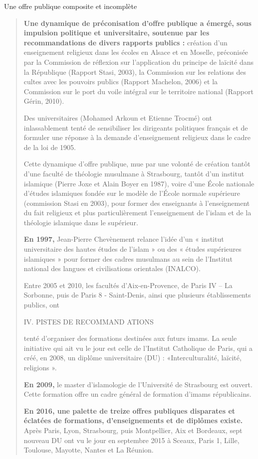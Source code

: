 Une offre publique composite et incomplète

\begin{quote}
\textbf{Une dynamique de préconisation d'offre publique a émergé, sous
impulsion politique et universitaire, soutenue par les recommandations
de divers rapports publics :} création d'un enseignement religieux dans
les écoles en Alsace et en Moselle, préconisée par la Commission de
réflexion sur l'application du principe de laïcité dans la République
(Rapport Stasi, 2003), la Commission sur les relations des cultes avec
les pouvoirs publics (Rapport Machelon, 2006) et la Commission sur le
port du voile intégral sur le territoire national (Rapport Gérin, 2010).

Des universitaires (Mohamed Arkoun et Etienne Trocmé) ont inlassablement
tenté de sensibiliser les dirigeants politiques français et de formuler
une réponse à la demande d'enseignement religieux dans le cadre de la
loi de 1905.

Cette dynamique d'offre publique, mue par une volonté de création tantôt
d'une faculté de théologie musulmane à Strasbourg, tantôt d'un institut
islamique (Pierre Joxe et Alain Boyer en 1987), voire d'une École
nationale d'études islamiques fondée sur le modèle de l'École normale
supérieure (commission Stasi en 2003), pour former des enseignants à
l'enseignement du fait religieux et plus particulièrement l'enseignement
de l'islam et de la théologie islamique dans le supérieur.

\textbf{En 1997,} Jean-Pierre Chevènement relance l'idée d'un « institut
universitaire des hautes études de l'islam » ou des « études supérieures
islamiques » pour former des cadres musulmans au sein de l'Institut
national des langues et civilisations orientales (INALCO).

Entre 2005 et 2010, les facultés d'Aix-en-Provence, de Paris IV -- La
Sorbonne, puis de Paris 8 - Saint-Denis, ainsi que plusieurs
établissements publics, ont

IV. PISTES DE RECOMMAND ATIONS

tenté d'organiser des formations destinées aux futurs imams. La seule
initiative qui ait vu le jour est celle de l'Institut Catholique de
Paris, qui a créé, en 2008, un diplôme universitaire (DU) :
«Interculturalité, laïcité, religions ».

\textbf{En 2009,} le master d'islamologie de l'Université de Strasbourg
est ouvert. Cette formation offre un cadre général de formation d'imams
républicains.

\textbf{En 2016, une palette de treize offres publiques disparates et
éclatées de formations, d'enseignements et de diplômes existe.} Après
Paris, Lyon, Strasbourg, puis Montpellier, Aix et Bordeaux, sept nouveau
DU ont vu le jour en septembre 2015 à Sceaux, Paris 1, Lille, Toulouse,
Mayotte, Nantes et La Réunion.
\end{quote}

